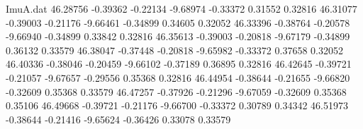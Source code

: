 \begin{filecontents}{ImuA.dat}
  46.28756   -0.39362   -0.22134   -9.68974   -0.33372    0.31552    0.32816
  46.31077   -0.39003   -0.21176   -9.66461   -0.34899    0.34605    0.32052
  46.33396   -0.38764   -0.20578   -9.66940   -0.34899    0.33842    0.32816
  46.35613   -0.39003   -0.20818   -9.67179   -0.34899    0.36132    0.33579
  46.38047   -0.37448   -0.20818   -9.65982   -0.33372    0.37658    0.32052
  46.40336   -0.38046   -0.20459   -9.66102   -0.37189    0.36895    0.32816
  46.42645   -0.39721   -0.21057   -9.67657   -0.29556    0.35368    0.32816
  46.44954   -0.38644   -0.21655   -9.66820   -0.32609    0.35368    0.33579
  46.47257   -0.37926   -0.21296   -9.67059   -0.32609    0.35368    0.35106
  46.49668   -0.39721   -0.21176   -9.66700   -0.33372    0.30789    0.34342
  46.51973   -0.38644   -0.21416   -9.65624   -0.36426    0.33078    0.33579
\end{filecontents}
